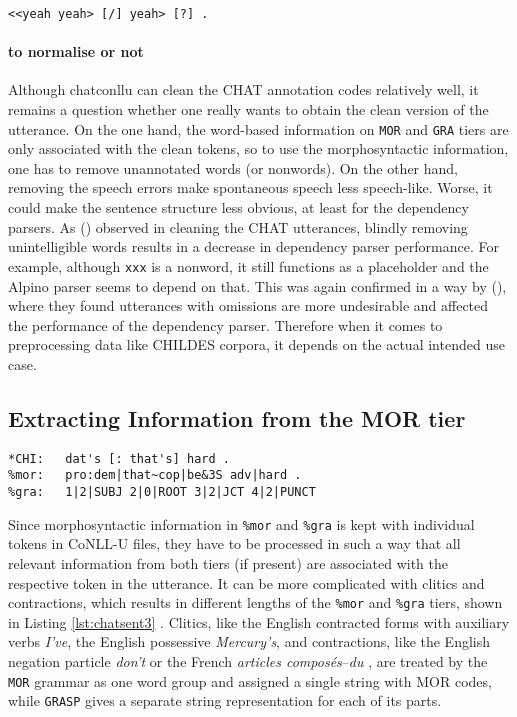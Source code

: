 \texttt{<<yeah yeah> [/] yeah> [?] .}

\paragraph{to normalise or not} Although chatconllu can clean the CHAT annotation codes relatively well, it remains a question whether one really wants to obtain the clean version of the utterance. On the one hand, the word-based information on \texttt{MOR} and \texttt{GRA} tiers are only associated with the clean tokens, so to use the morphosyntactic information, one has to remove unannotated words (or nonwords). On the other hand, removing the speech errors make spontaneous speech less speech-like. Worse, it could make the sentence structure less obvious, at least for the dependency parsers. As (\cite{odijk2018anncor}) observed in cleaning the CHAT utterances, blindly removing unintelligible words results in a decrease in dependency parser performance. For example, although \texttt{xxx} is a nonword, it still functions as a placeholder  and the Alpino parser seems to depend on that. This was again confirmed in a way by (\cite{liu2021}), where they found utterances with omissions are more undesirable and affected the performance of the dependency parser. Therefore when it comes to preprocessing data like CHILDES corpora, it depends on the actual intended use case.

\subsection{Extracting Information from the MOR tier}

\lstset{
numbers = none,
frame = single,
}

\begin{lstlisting}[caption={Example to show the different number of strings in \texttt{\%mor} and \texttt{\&gra} tiers due to contracted form \emph{that's}.}, label={lst:chatsent3}]
*CHI:   dat's [: that's] hard .
%mor:   pro:dem|that~cop|be&3S adv|hard .
%gra:   1|2|SUBJ 2|0|ROOT 3|2|JCT 4|2|PUNCT
\end{lstlisting}


Since morphosyntactic information in \texttt{\%mor} and \texttt{\%gra} is kept with individual tokens in CoNLL-U files, they have to be processed in such a way that all relevant information from both tiers (if present) are associated with the respective token in the utterance. It can be more complicated with clitics and contractions, which results in different lengths of the \texttt{\%mor} and \texttt{\%gra} tiers, shown in Listing \ref{lst:chatsent3} . Clitics, like the English contracted forms with auxiliary verbs \emph{I've}, the English possessive \emph{Mercury's}, and contractions, like the English negation particle \emph{don't} or the French \emph{articles composés}--\emph{du} , are treated by the \texttt{MOR} grammar as one word group and assigned a single string with MOR codes, while \texttt{GRASP} gives a separate string representation for each of its parts.



